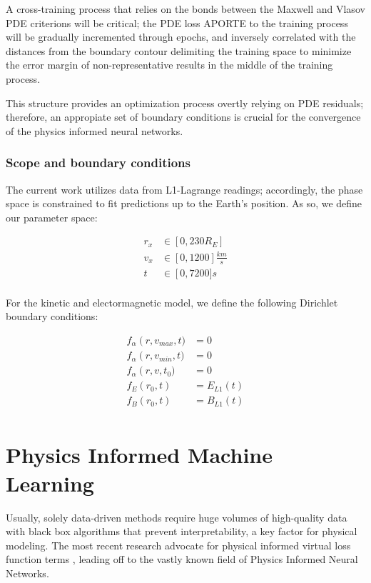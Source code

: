 \documentclass[12pt]{article}
\begin{document}
A cross-training process that relies on the bonds between the Maxwell and Vlasov PDE criterions will be critical; the PDE loss APORTE to the training process will be gradually incremented through epochs, and inversely correlated with the distances from the boundary contour delimiting the training space to minimize the error margin of non-representative results in the middle of the training process.

This structure provides an optimization process overtly relying on PDE residuals; therefore, an appropiate set of boundary conditions is crucial for the convergence of the physics informed neural networks.

\subsubsection{Scope and boundary conditions}
The current work utilizes data from L1-Lagrange readings; accordingly, the phase space is constrained to fit predictions up to the Earth's position. As so, we define our parameter space:

\begin{align*}
    r_x &\in \left[0, 230R_E\right] \\
    v_x &\in \left[0, 1200\right]\frac{km}{s} \\
    t &\in \left[0, 7200]s \\
\end{align*}

For the kinetic and electormagnetic model, we define the following Dirichlet boundary conditions:

\begin{align*}
    f_\alpha\left(r, v_{max}, t) &= 0 \\
    f_\alpha\left(r, v_{min}, t) &= 0 \\
    f_\alpha\left(r, v, t_0) &= 0 \\
    f_E\left(r_0, t\right) &= E_{L1}(t) \\
    f_B\left(r_0, t\right) &= B_{L1}(t) \\
\end{align*}

\section{Physics Informed Machine Learning}
Usually, solely data-driven methods require huge volumes of high-quality data with black box algorithms that prevent interpretability, a key factor for physical modeling. The most recent research advocate for physical informed virtual loss function terms \cite{}, leading off to the vastly known field of Physics Informed Neural Networks.
\end{document}
